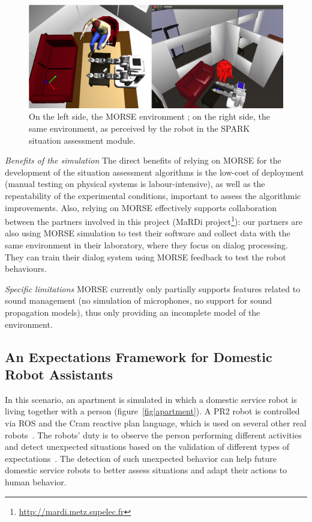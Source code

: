 \documentclass[conference]{IEEEtran}
\begin{document}
\begin{figure}[H]
      \centering
      \includegraphics[width=0.9\linewidth]{morsespark.png}
      \caption{On the left side, the MORSE environment ; on the right side, the same
      environment, as perceived by the robot in the SPARK situation assessment
      module.}
      \label{fig|spark}
\end{figure}

\emph{Benefits of the simulation} The direct benefits of relying on MORSE for
the development of the situation assessment algorithms is the low-cost of
deployment (manual testing on physical systems is labour-intensive), as well as
the repeatability of the experimental conditions, important to assess the
algorithmic improvements.  Also, relying on MORSE effectively supports
collaboration between the partners involved in this project (MaRDi
project\footnote{\url{http://mardi.metz.supelec.fr}}): our partners are also
using MORSE simulation to test their software and collect data with the same
environment in their laboratory, where they focus on dialog processing. They can
train their dialog system using MORSE feedback to test the robot behaviours.

\emph{Specific limitations} MORSE currently only partially supports features
related to sound management (no simulation of microphones, no support for sound
propagation models), thus only providing an incomplete model of the environment.

\subsection{An Expectations Framework for Domestic Robot Assistants}
\label{sc:expectations}

In this scenario, an apartment is simulated in which a domestic 
service robot is living together with a person (figure~\ref{fig|apartment}). 
A PR2 robot is controlled via ROS and the {\sc Cram} reactive plan language, 
which is used on several other real robots~\cite{pancakes11humanoids}. The robots' 
duty is to observe the person performing different activities and detect unexpected 
situations based on the validation of different types of expectations~\cite{Karg2013}. 
The detection of such unexpected behavior can help future domestic service robots 
to better assess situations and adapt their actions to human behavior.
\end{document}

